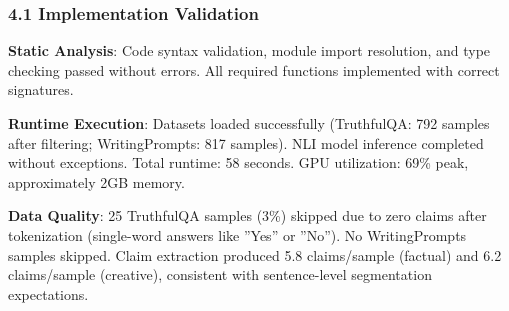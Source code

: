 
\subsubsection{4.1 Implementation Validation}

\textbf{Static Analysis}: Code syntax validation, module import resolution, and type checking passed without errors. All required functions implemented with correct signatures.

\textbf{Runtime Execution}: Datasets loaded successfully (TruthfulQA: 792 samples after filtering; WritingPrompts: 817 samples). NLI model inference completed without exceptions. Total runtime: 58 seconds. GPU utilization: 69\% peak, approximately 2GB memory.

\textbf{Data Quality}: 25 TruthfulQA samples (3\%) skipped due to zero claims after tokenization (single-word answers like ''Yes'' or ''No''). No WritingPrompts samples skipped. Claim extraction produced 5.8 claims/sample (factual) and 6.2 claims/sample (creative), consistent with sentence-level segmentation expectations.
